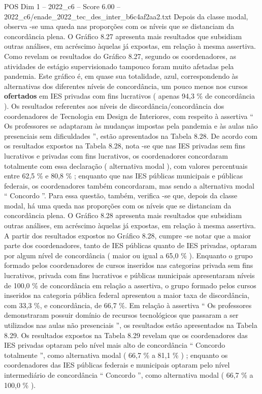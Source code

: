 \begin{textsample}{POS Dim 1 – 2022\_c6 – Score 6.00 – 2022\_c6/enade\_2022\_tec\_des\_inter\_b6c4af2aa2.txt}
Depois da classe modal, observa -se uma queda nas proporções com os níveis que se distanciam da concordância plena.
O Gráfico 8.27 apresenta mais resultados que subsidiam outras análises, em acréscimo àquelas já expostas, em relação à mesma assertiva.
Como revelam os resultados do Gráfico 8.27, segundo os coordenadores, as atividades de estágio supervisionado tampouco foram muito afetadas pela pandemia.
Este gráfico é, em quase sua totalidade, azul, correspondendo às alternativas dos diferentes níveis de concordância, um pouco menos nos cursos \textbf{ofertados} em IES privadas com fins lucrativos ( apenas 94,3 \% de concordância ).
Os resultados referentes aos níveis de discordância/concordância dos coordenadores de Tecnologia em Design de Interiores, com respeito à assertiva “ Os professores se adaptaram às mudanças impostas pela pandemia e às aulas não presenciais sem dificuldades ”, estão apresentados na Tabela 8.28.
De acordo com os resultados expostos na Tabela 8.28, nota -se que nas IES privadas sem fins lucrativos e privadas com fins lucrativos, os coordenadores concordaram totalmente com essa declaração ( alternativa modal ), com valores percentuais entre 62,5 \% e 80,8 \% ; enquanto que nas IES públicas municipais e públicas federais, os coordenadores também concordaram, mas sendo a alternativa modal “ Concordo ”.
Para essa questão, também, verifica -se que, depois da classe modal, há uma queda nas proporções com os níveis que se distanciam da concordância plena.
O Gráfico 8.28 apresenta mais resultados que subsidiam outras análises, em acréscimo àquelas já expostas, em relação à mesma assertiva.
A partir dos resultados expostos no Gráfico 8.28, cumpre -se notar que a maior parte dos coordenadores, tanto de IES públicas quanto de IES privadas, optaram por algum nível de concordância ( maior ou igual a 65,0 \% ).
Enquanto o grupo formado pelos coordenadores de cursos inseridos nas categorias privada sem fins lucrativos, privada com fins lucrativos e públicas municipais apresentaram níveis de 100,0 \% de concordância em relação a assertiva, o grupo formado pelos cursos inseridos na categoria pública federal apresentou a maior taxa de discordância, com 33,3 \%, e concordância, de 66,7 \%.
Em relação à assertiva “ Os professores demonstraram possuir domínio de recursos tecnológicos que passaram a ser utilizados nas aulas não presenciais ”, os resultados estão apresentados na Tabela 8.29.
Os resultados expostos na Tabela 8.29 revelam que os coordenadores das IES privadas optaram pelo nível mais alto de concordância “ Concordo totalmente ”, como alternativa modal ( 66,7 \% a 81,1 \% ) ; enquanto os coordenadores das IES públicas federais e municipais optaram pelo nível intermediário de concordância “ Concordo ”, como alternativa modal ( 66,7 \% a 100,0 \% ).

\end{textsample}
